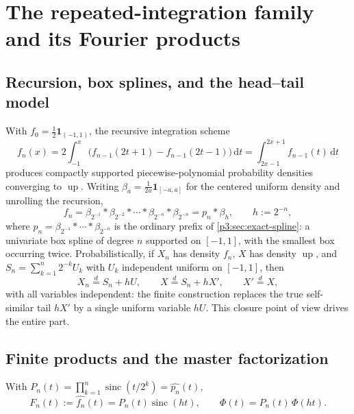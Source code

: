 \documentclass[11pt,oneside]{article}
\numberwithin{equation}{section}
\theoremstyle{definition}
\theoremstyle{remark}
\newcommand{\Up}{\operatorname{up}}
\newcommand{\sinc}{\operatorname{sinc}}
\newcommand{\dd}{\,\mathrm d}
\begin{document}
\section{The repeated-integration family and its Fourier products}
\label{p4:sec:w-objects}

\subsection{Recursion, box splines, and the head--tail model}

With $f_0=\tfrac12\mathbf 1_{(-1,1)}$, the recursive integration scheme
\begin{equation}
 f_n(x)=2\int_{-1}^{x}\bigl(f_{n-1}(2t+1)-f_{n-1}(2t-1)\bigr)\dd t
 =\int_{2x-1}^{2x+1}f_{n-1}(t)\dd t
 \label{p4:eq:w-recursion}
\end{equation}
produces compactly supported piecewise-polynomial probability densities
converging to $\Up$.  Writing $\beta_a=\tfrac1{2a}\mathbf 1_{[-a,a]}$ for
the centered uniform density and unrolling the recursion,
\begin{equation}
 f_n=\beta_{2^{-1}}*\beta_{2^{-2}}*\cdots*\beta_{2^{-n}}*\beta_{2^{-n}}
 =p_n*\beta_h,
 \qquad h:=2^{-n},
 \label{p4:eq:w-convolution}
\end{equation}
where $p_n=\beta_{2^{-1}}*\cdots*\beta_{2^{-n}}$ is the ordinary prefix of
\cref{p3:sec:exact-spline}: a univariate box spline of degree $n$ supported
on $[-1,1]$, with the smallest box occurring twice.  Probabilistically, if
$X_n$ has density $f_n$, $X$ has density $\Up$, and
$S_n=\sum_{k=1}^{n}2^{-k}U_k$ with $U_k$ independent uniform on $[-1,1]$,
then
\begin{equation}
 X_n\overset d=S_n+hU,
 \qquad
 X\overset d=S_n+hX',
 \qquad X'\overset d=X,
 \label{p4:eq:w-tail-models}
\end{equation}
with all variables independent: the finite construction replaces the true
self-similar tail $hX'$ by a single uniform variable $hU$.  This closure
point of view drives the entire part.

\subsection{Finite products and the master factorization}

With $P_n(t)=\prod_{k=1}^{n}\sinc(t/2^k)=\widehat{p_n}(t)$,
\begin{equation}
 F_n(t):=\widehat{f_n}(t)=P_n(t)\sinc(ht),
 \qquad
 \Phi(t)=P_n(t)\,\Phi(ht).
 \label{p4:eq:w-two-products}
\end{equation}
\end{document}
